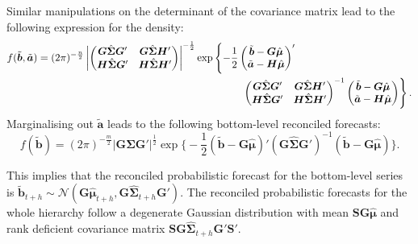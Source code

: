 \documentclass[a4paper, 11pt]{article}
\def\PQ{\begin{pmatrix}\bm{G}\\[-0.2cm]\bm{H}\end{pmatrix}}
\theoremstyle{definition}
\begin{document}

Similar manipulations on the determinant of the covariance matrix lead to the following expression for the density:
\begin{align*}
f(\tilde{\bm{b}},\tilde{\bm{a}})&
=(2\pi)^{-\frac{n}{2}}\left|
\begin{pmatrix}
  \bm{G}\hat{\bm{\Sigma}}\bm{G}' & \bm{G}\hat{\bm{\Sigma}}\bm{H}' \\
  \bm{H}\hat{\bm{\Sigma}}\bm{G}' & \bm{H}\hat{\bm{\Sigma}}\bm{H}'
\end{pmatrix}
\right|^{-\frac{1}{2}}
\exp \left\{-\frac{1}{2} \begin{pmatrix}\tilde{\bm{b}} - \bm{G}\hat{\bm{\mu}}\\ \tilde{\bm{a}}- \bm{H}\hat{\bm{\mu}}\end{pmatrix}'\right.\\
&\hspace*{7cm}
\left.\begin{pmatrix}
\bm{G}\hat{\bm{\Sigma}}\bm{G}' & \bm{G}\hat{\bm{\Sigma}}\bm{H}' \\
\bm{H}\hat{\bm{\Sigma}}\bm{G}' & \bm{H}\hat{\bm{\Sigma}}\bm{H}'
\end{pmatrix}^{-1}
\begin{pmatrix}\tilde{\bm{b}} - \bm{G}\hat{\bm{\mu}}\\ \tilde{\bm{a}}- \bm{H}\hat{\bm{\mu}}\end{pmatrix} \right\}.
\end{align*}
Marginalising out $\tilde{\bm{a}}$ leads to the following bottom-level reconciled forecasts:
\begin{equation}\label{ex:2.1}
f(\tilde{\bm{b}})=(2\pi)^{-\frac{m}{2}}\Big|\bm{G}\hat{\bm{\Sigma}}\bm{G}'\Big|^{\frac{1}{2}}
\exp \Big\{-\frac{1}{2} (\tilde{\bm{b}} - \bm{G}\hat{\bm{\mu}})' (\bm{G}\hat{\bm{\Sigma}}\bm{G}')^{-1}(\tilde{\bm{b}} - \bm{G}\hat{\bm{\mu}}) \Big\}.
\end{equation}

This implies that the reconciled probabilistic forecast for the bottom-level series is $\tilde{\bm{b}}_{t+h} \sim \mathcal{N}(\bm{G}\hat{\bm{\mu}}_{t+h}, \bm{G}\hat{\bm{\Sigma}}_{t+h}\bm{G}')$. The reconciled probabilistic forecasts for the whole hierarchy follow a degenerate Gaussian distribution with mean $\bm{SG}\hat{\bm{\mu}}$ and rank deficient covariance matrix $\bm{SG}\hat{\bm{\Sigma}}_{t+h}\bm{G}'\bm{S}'$.
\end{document}
